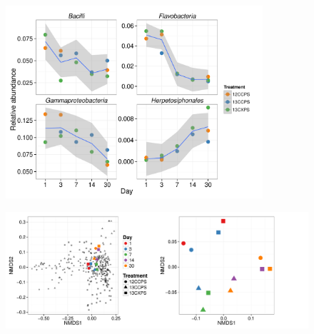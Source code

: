 \begin{figure}[H]
	\begin{center}
    \centerline{\includegraphics[width=0.85\textwidth]{figures/abndVtime_class/abndVtime_class.pdf}}
	\caption{\protect}\label{fig:time_class}
    \end{center}
\end{figure}

\begin{figure}[H]
	\begin{center}
		\centerline{\includegraphics[width=\textwidth]{figures/bulk_ordination/bulk_ordination.pdf}}
	\caption{\protect}\label{fig:bulk_ord}
        \end{center}
\end{figure}


